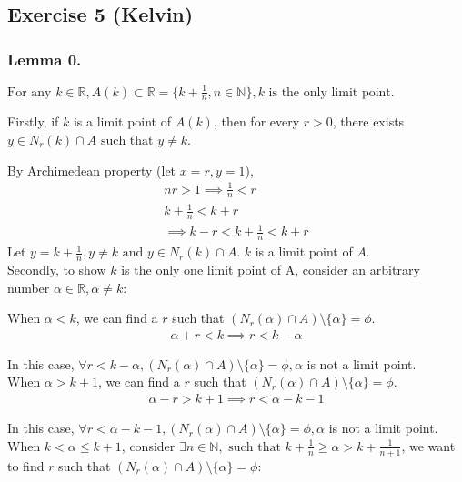 \subsection*{Exercise 5 (Kelvin)}
\subsubsection*{Lemma 0.}
$\text{For any } k \in \mathbb{R}, A(k) \subset \mathbb{R} = \{k + \frac{1}{n}, n \in \mathbb{N}\}, k \text{ is the only limit point.}$

Firstly, if $k$ is a limit point of $A(k)$, then for every $r > 0$, there exists $y \in N_r(k) \cap A \text{ such that } y \neq k$.

By Archimedean property (let $x = r, y = 1$), 
\begin{eqnarray*}
nr > 1 \implies \frac{1}{n} < r \\
k + \frac{1}{n} < k + r \\
\implies k - r < k + \frac{1}{n} < k + r
\end{eqnarray*}
Let $y = k + \frac{1}{n}, y \neq k \text{ and } y \in N_r(k) \cap A$. $k$ is a limit point of $A$.\\

Secondly, to show $k$ is the only one limit point of A, consider an arbitrary number $\alpha \in \mathbb{R}, \alpha \neq k$:

When $\alpha < k$, we can find a $r$ such that $(N_r(\alpha) \cap A) \setminus \{\alpha\} = \phi$.
\begin{eqnarray*}
    \alpha + r < k \implies r < k - \alpha
\end{eqnarray*}

In this case, $\forall r < k - \alpha, (N_r(\alpha) \cap A) \setminus \{\alpha\} = \phi, \alpha$ is not a limit point. \\

When $\alpha > k + 1$, we can find a $r$ such that $(N_r(\alpha) \cap A) \setminus \{\alpha\} = \phi$.
\begin{eqnarray*}
    \alpha - r > k + 1 \implies r < \alpha - k - 1
\end{eqnarray*}

In this case, $\forall r < \alpha - k - 1, (N_r(\alpha) \cap A) \setminus \{\alpha\} = \phi, \alpha$ is not a limit point. \\

When $k < \alpha \le k + 1$, consider $\exists n \in \mathbb{N}, \text{ such that } k + \frac{1}{n} \ge \alpha > k + \frac{1}{n + 1}$, we want to find $r$ such that $(N_r(\alpha) \cap A) \setminus \{\alpha\} = \phi$:

